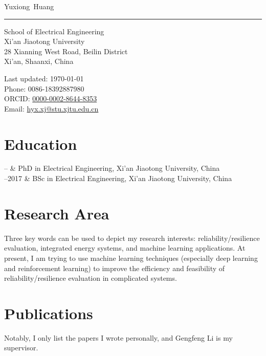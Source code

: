 \documentclass[11pt, a4paper]{article}
\makeatletter
\newcommand{\XJTUEE}{School of Electrical Engineering}
\newcommand{\XJTU}{Xi'an Jiaotong University}
\newcommand{\FirstName}{Yuxiong}
\newcommand{\LastName}{Huang}
\newcommand{\MyName}{\FirstName\ \LastName}
\newcommand{\Email}{hyx.xj@stu.xjtu.edu.cn}
\newcommand{\Phone}{0086-18392887980}
\newcommand{\ORCID}{0000-0002-8644-8353}
\newcommand{\Affiliation}{\XJTUEE \\ \XJTU}
\newcommand{\Address}{
  28 Xianning West Road, Beilin District \\ Xi'an, Shaanxi, China
}
\newcommand{\Duration}[2]{\fontsize{10pt}{0}\selectfont #1--#2}
\makeatother
\begin{document}
\thispagestyle{empty}

{\fontsize{24pt}{0}\selectfont\MyName}\\[-0.1cm]
\rule{\textwidth}{0.2pt}
\begin{minipage}[t]{0.595\textwidth}
  \Affiliation
  \\
  \Address
\end{minipage}
\begin{minipage}[t]{0.405\textwidth}
  \begin{flushright}
  Last updated: \monthyear\today
  \\
    Phone: \Phone
    \\
    ORCID: \href{https://orcid.org/\ORCID}{\ORCID}
    \\
    Email: \href{mailto:\Email}{\Email}
    
  \end{flushright}
\end{minipage}


\section{Education}

\begin{EntriesTable}
  \Duration{2017}{}  &
  PhD in Electrical Engineering, \XJTU, China
  \\
  \Duration{2013}{2017}  &
  BSc in Electrical Engineering, \XJTU, China
\end{EntriesTable}


\section{Research Area}
Three key words can be used to depict my research interests: reliability/resilience evaluation, integrated energy systems, and machine learning applications. At present, I am trying to use machine learning techniques (especially deep learning and reinforcement learning) to improve the efficiency and feasibility of reliability/resilience evaluation in complicated systems. 


\section{Publications}
Notably, I only list the papers I wrote personally, and Gengfeng Li is my supervisor.
%
%
\end{document}

